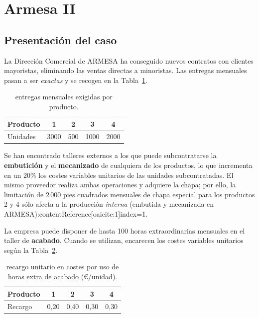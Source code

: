 \section{Armesa II}


\subsection{Presentación del caso}

La Dirección Comercial de ARMESA ha conseguido nuevos contratos con clientes mayoristas,
eliminando las ventas directas a minoristas. Las entregas mensuales pasan a ser
\emph{exactas} y se recogen en la Tabla~\ref{tab:armesaII-entregas}.

\begin{table}[!h]
\centering
\caption{entregas mensuales exigidas por producto.}
\label{tab:armesaII-entregas}
\begin{tabular}{lcccc}
\hline
Producto & 1 & 2 & 3 & 4 \\ \hline
Unidades & 3000 & 500 & 1000 & 2000 \\
\hline
\end{tabular}
\end{table}

Se han encontrado talleres externos a los que puede subcontratarse la \textbf{embutición} y el
\textbf{mecanizado} de cualquiera de los productos, lo que incrementa en un 20\% los costes
variables unitarios de las unidades subcontratadas. El mismo proveedor realiza ambas
operaciones y adquiere la chapa; por ello, la limitación de 2\,000 pies cuadrados mensuales
de chapa especial para los productos 2 y 4 sólo afecta a la producción \emph{interna}
(embutida y mecanizada en ARMESA):contentReference[oaicite:1]{index=1}.

La empresa puede disponer de hasta 100 horas extraordinarias mensuales en el taller de
\textbf{acabado}. Cuando se utilizan, encarecen los costes variables unitarios según
la Tabla~\ref{tab:armesaII-recargos}.

\begin{table}[!h]
\centering
\caption{recargo unitario en costes por uso de horas extra de acabado (€/unidad).}
\label{tab:armesaII-recargos}
\begin{tabular}{lcccc}
\hline
Producto & 1 & 2 & 3 & 4 \\ \hline
Recargo  & 0{,}20 & 0{,}40 & 0{,}30 & 0{,}30 \\
\hline
\end{tabular}
\end{table}

